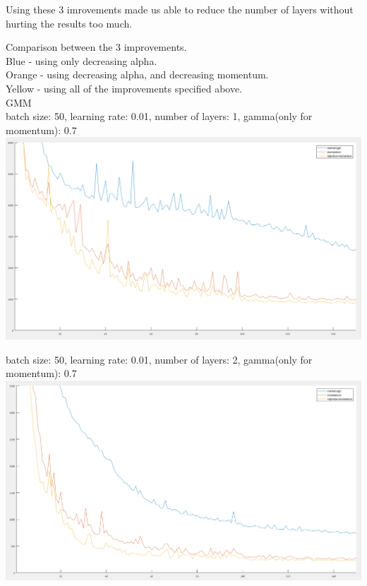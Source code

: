 \documentclass{article}
\numberwithin{equation}{section}
\begin{document}
Using these 3 imrovements made us able to reduce the number of layers without hurting the results too much.

\newpage

Comparison between the 3 improvements.\\

Blue - using only decreasing alpha.\\
Orange - using decreasing alpha, and decreasing momentum.\\
Yellow - using all of the improvements specified above.\\

GMM\\
batch size: 50, learning rate: 0.01, number of layers: 1, gamma(only for momentum): 0.7\\
\includegraphics[width=\textwidth]{rej_m_gmm_1layer.png}

batch size: 50, learning rate: 0.01, number of layers: 2, gamma(only for momentum): 0.7\\
\includegraphics[width=\textwidth]{rej_m_gmm_2layers.png}
\end{document}
